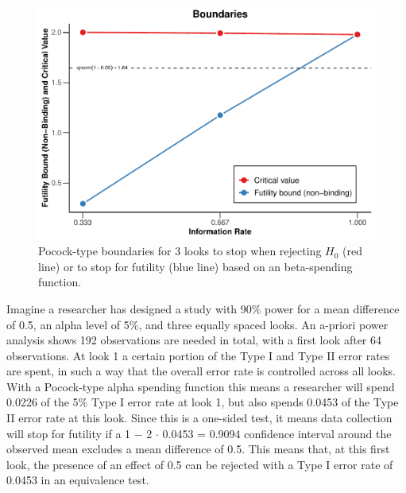 \documentclass[
  english,
  ,jou, a4paper,floatsintext]{apa6}
\begin{document}
\begin{figure}
\centering
\includegraphics{sequential_tutorial_files/figure-latex/futility2-1.pdf}
\caption{\label{fig:futility2}Pocock-type boundaries for 3 looks to stop when rejecting \(H_0\) (red line) or to stop for futility (blue line) based on an beta-spending function.}
\end{figure}

Imagine a researcher has designed a study with 90\% power for a mean difference of 0.5, an alpha level of 5\%, and three equally spaced looks. An a-priori power analysis shows 192 observations are needed in total, with a first look after 64 observations. At look 1 a certain portion of the Type I and Type II error rates are spent, in such a way that the overall error rate is controlled across all looks. With a Pocock-type alpha spending function this means a researcher will spend 0.0226 of the 5\% Type I error rate at look 1, but also spends 0.0453 of the Type II error rate at this look.
Since this is a one-sided test, it means data collection will stop for futility if a 1 \(-\) 2 \(\cdot\) 0.0453 = 0.9094 confidence interval around the observed mean excludes a mean difference of 0.5. This means that, at this first look, the presence of an effect of 0.5 can be rejected with a Type I error rate of 0.0453 in an equivalence test.
\end{document}
